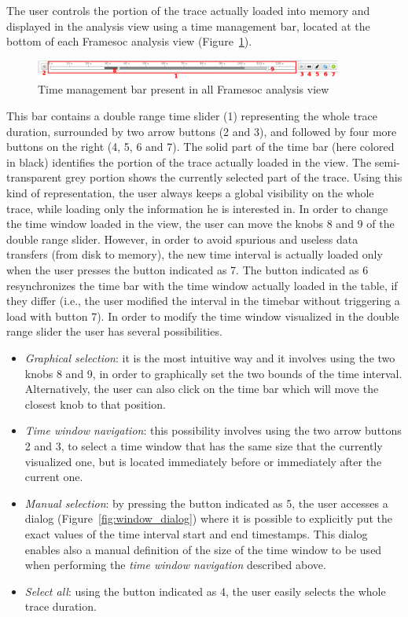 \documentclass[twoside]{article}
\begin{document}
\begin{sloppypar}
The user controls the portion of the trace actually loaded into memory and displayed in the analysis view using a time management bar, located at the bottom of each Framesoc analysis view (Figure~\ref{fig:timebar}).

\begin{figure}[h!]
  \centering
    \includegraphics[width=0.9\textwidth]{images/time_bar.png}
  \caption{Time management bar present in all Framesoc analysis view}
  \label{fig:timebar}
\end{figure}

This bar contains a double range time slider (\num{1}) representing the whole trace duration, surrounded by two arrow buttons (\num{2} and \num{3}), and followed by four more buttons on the right (\num{4}, \num{5}, \num{6} and \num{7}).
The solid part of the time bar (here colored in black) identifies the portion of the trace actually loaded in the view.
The semi-transparent grey portion shows the currently selected part of the trace.
Using this kind of representation, the user always keeps a global visibility on the whole trace, while loading only the information he is interested in.
In order to change the time window loaded in the view, the user can move the knobs \num{8} and \num{9} of the double range slider.
However, in order to avoid spurious and useless data transfers (from disk to memory), the new time interval is actually loaded only when the user presses the button indicated as \num{7}.
The button indicated as \num{6} resynchronizes the time bar with the time window actually loaded in the table, if they differ (i.e., the user modified the interval in the timebar without triggering a load with button \num{7}).
In order to modify the time window visualized in the double range slider the user has several possibilities. 
\begin{itemize}
 \item \emph{Graphical selection}: it is the most intuitive way and it involves using the two knobs \num{8} and \num{9}, in order to graphically set the two bounds of the time interval. Alternatively, the user can also click on the time bar which will move the closest knob to that position.
 \item \emph{Time window navigation}: this possibility involves using the two arrow buttons \num{2} and \num{3}, to select a time window that has the same size that the currently visualized one, but is located immediately before or immediately after the current one.
 \item \emph{Manual selection}: by pressing the button indicated as \num{5}, the user accesses a dialog (Figure~\ref{fig:window_dialog}) where it is possible to explicitly put the exact values of the time interval start and end timestamps. 
 This dialog enables also a manual definition of the size of the time window to be used when performing the \emph{time window navigation} described above.
 \item \emph{Select all}: using the button indicated as \num{4}, the user easily selects the whole trace duration.
\end{itemize}


\end{sloppypar}
\end{document}
